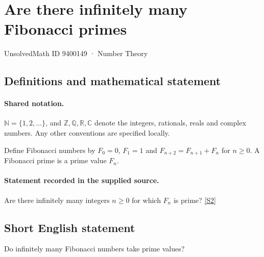 \documentclass[11pt]{article}
\newcommand{\sref}[2]{\hyperlink{source:#1:#2}{[S#2]}}
\begin{document}
\setcounter{section}{9400148}
\section{Are there infinitely many Fibonacci primes}\label{9400149}
{\small\sffamily UnsolvedMath ID 9400149 · Number Theory}
\subsection{Definitions and mathematical statement}

\paragraph{Shared notation.}$\mathbb N=\{1,2,\ldots\}$, and $\mathbb Z,\mathbb Q,\mathbb R,\mathbb C$ denote the integers, rationals, reals and complex numbers. Any other conventions are specified locally.


Define Fibonacci numbers by $F_0=0$, $F_1=1$ and $F_{n+2}=F_{n+1}+F_n$ for $n\ge0$. A Fibonacci prime is a prime value $F_n$.
\paragraph{Statement recorded in the supplied source.}
Are there infinitely many integers $n\ge0$ for which $F_n$ is prime? \sref{9400149}{2}
\subsection{Short English statement}
Do infinitely many Fibonacci numbers take prime values?
\end{document}
